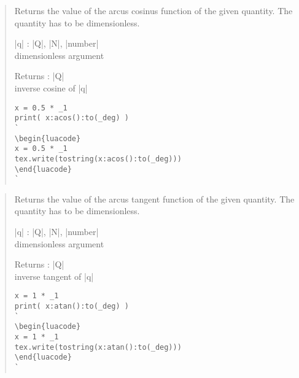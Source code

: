 \documentclass{ltxdoc}
\begin{document}
\begin{quote}
  Returns the value of the arcus cosinus function of the given quantity. The quantity has to be dimensionless.

  \begin{description}
  \item |q| : |Q|, |N|, |number|\\
    dimensionless argument

  \item Returns : |Q|\\
    inverse cosine of |q|
  \end{description}

\begin{lstlisting}
x = 0.5 * _1
print( x:acos():to(_deg) )
`
\begin{luacode}
x = 0.5 * _1
tex.write(tostring(x:acos():to(_deg)))
\end{luacode}
`
\end{lstlisting}

\end{quote}




\begin{quote}
  Returns the value of the arcus tangent function of the given quantity. The quantity has to be dimensionless.

  \begin{description}
  \item |q| : |Q|, |N|, |number|\\
    dimensionless argument

  \item Returns : |Q|\\
    inverse tangent of |q|
  \end{description}

\begin{lstlisting}
x = 1 * _1
print( x:atan():to(_deg) )
`
\begin{luacode}
x = 1 * _1
tex.write(tostring(x:atan():to(_deg)))
\end{luacode}
`
\end{lstlisting}

\end{quote}
\end{document}
